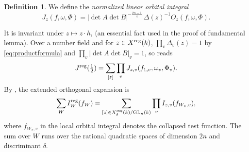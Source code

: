 \documentclass[11pt,oneside,notitlepage]{book}
\numberwithin{equation}{section}
\theoremstyle{plain}
\theoremstyle{definition}
\newtheorem{definition}[theorem]{Definition}
\newcommand{\GL}{\mathrm{GL}}
\begin{document}
\begin{definition}
	We define the \emph{normalized linear orbital integral}
	\begin{equation}\label{eq:Jz}
		J_z(f,\omega,\Phi)=|\det A\det B|^{-\frac{2n-1}4}\,\Delta(z)^{-1}O_z(f,\omega,\Phi).
	\end{equation}
\end{definition} 
It is invariant under $z\mapsto z\cdot h$, (an essential fact used in the proof of fundamental lemma). Over a number field and for $z\in X^{\rm reg}(k)$, $\prod_v\Delta_v(z)=1$ by \eqref{eq:productformula} and $\prod_v|\det A\det B|_v=1$, so  reads
\[J^{\rm reg}(\tfrac12)=\sum_{[z]}\prod_vJ_{z,v}(f_{1,v},\omega_v,\Phi_v).\]
By , the extended orthogonal expansion is
\[
 \sum_W I_W^{\rm reg}(f_W)
 =\sum_{[z]\in X^{\rm reg}_\delta(k)/\GL_n(k)}
   \prod_v I_{z,v}(f_{W_z,v}),
\]
where $f_{W_z,v}$ in the local orbital integral denotes the collapsed test function. The sum over $W$ runs over the rational quadratic spaces of dimension $2n$ and discriminant $\delta$. 
\end{document}
